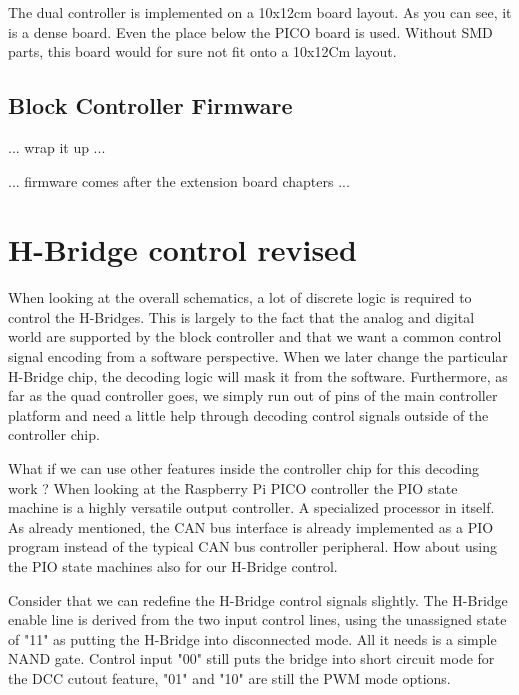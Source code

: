 The dual controller is implemented on a 10x12cm board layout. As you can see, it is a dense board. Even the place below the PICO board is used. Without SMD parts, this board would for sure not fit onto a 10x12Cm layout.


\subsection{Block Controller Firmware}


... wrap it up ...

... firmware comes after the extension board chapters ...


\section{H-Bridge control revised}

When looking at the overall schematics, a lot of discrete logic is required to control the H-Bridges. This is largely to the fact that the analog and digital world are supported by the block controller and that we want a common control signal encoding from a software perspective. When we later change the particular H-Bridge chip, the decoding logic will mask it from the software. Furthermore, as far as the quad controller goes, we simply run out of pins of the main controller platform and need a little help through decoding control signals outside of the controller chip.

What if we can use other features inside the controller chip for this decoding work ? When looking at the Raspberry Pi PICO controller the PIO state machine is a highly versatile output controller. A specialized processor in itself. As already mentioned, the CAN bus interface is already implemented as a PIO program instead of the typical CAN bus controller peripheral. How about using the PIO state machines also for our H-Bridge control. 

Consider that we can redefine the H-Bridge control signals slightly. The H-Bridge enable line is derived from the two  input control lines, using the unassigned state of "11" as putting the H-Bridge into disconnected mode. All it needs is a simple NAND gate. Control input "00" still puts the bridge into short circuit mode for the DCC cutout feature, "01" and "10" are still the PWM mode options. 

